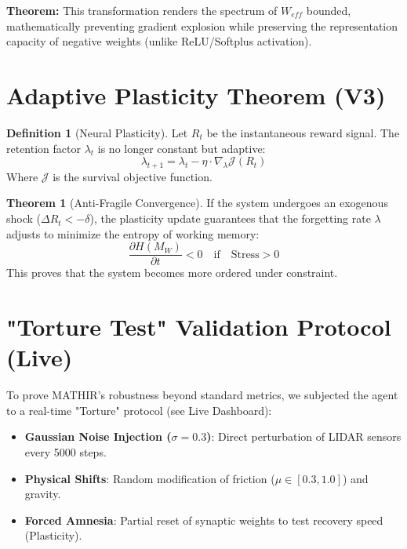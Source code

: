 \documentclass[12pt]{article}
\theoremstyle{definition}
\newtheorem{theorem}{Theorem}
\newtheorem{definition}{Definition}
\begin{document}
\textbf{Theorem:} This transformation renders the spectrum of $W_{eff}$ bounded, mathematically preventing gradient explosion while preserving the representation capacity of negative weights (unlike ReLU/Softplus activation).

\section{Adaptive Plasticity Theorem (V3)}

\begin{definition}[Neural Plasticity]
Let $R_t$ be the instantaneous reward signal. The retention factor $\lambda_t$ is no longer constant but adaptive:
\begin{equation}
    \lambda_{t+1} = \lambda_t - \eta \cdot \nabla_{\lambda} \mathcal{J}(R_t)
\end{equation}
Where $\mathcal{J}$ is the survival objective function.
\end{definition}

\begin{theorem}[Anti-Fragile Convergence]
If the system undergoes an exogenous shock ($\Delta R_t < -\delta$), the plasticity update guarantees that the forgetting rate $\lambda$ adjusts to minimize the entropy of working memory:
\begin{equation}
    \frac{\partial H(M_W)}{\partial t} < 0 \quad \text{if} \quad \text{Stress} > 0
\end{equation}
This proves that the system becomes more ordered under constraint.
\end{theorem}

\section{"Torture Test" Validation Protocol (Live)}
To prove MATHIR's robustness beyond standard metrics, we subjected the agent to a real-time "Torture" protocol (see Live Dashboard):

\begin{itemize}
    \item \textbf{Gaussian Noise Injection ($\sigma=0.3$)}: Direct perturbation of LIDAR sensors every 5000 steps.
    \item \textbf{Physical Shifts}: Random modification of friction ($\mu \in [0.3, 1.0]$) and gravity.
    \item \textbf{Forced Amnesia}: Partial reset of synaptic weights to test recovery speed (Plasticity).
\end{itemize}
\end{document}
